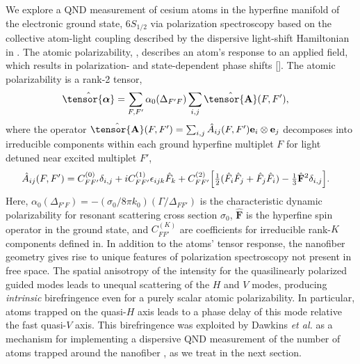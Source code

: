 \documentclass[preprint,aps,pra,onecolumn]{revtex4-1} %
\newcommand{\poltens}{\hat{\tensor{\boldsymbol{\alpha}}}}
\newcommand{\charpol}{\alpha_0(\Delta_{F'F})}
\begin{document}
 We explore a QND measurement of cesium atoms in the hyperfine manifold of the electronic ground state, $6S_{1/2}$ via polarization spectroscopy based on  the collective atom-light coupling described by the dispersive light-shift Hamiltonian in . The atomic polarizability, , describes an atom's response to an applied field, which results in polarization- and state-dependent phase shifts [].  The atomic polarizability is a rank-2 tensor,
	\begin{align} \label{Eq::Polarizability}
		\poltens %
		&=  \sum_{F,F'} \charpol \sum_{i,j} \hat{\tensor{\mbf{A}}}(F,F'),
	\end{align}
where the operator $\hat{\tensor{\mbf{A}}}(F,F') = \sum_{i,j} \hat{A}_{ij}(F,F')\mathbf{e}_i \otimes \mathbf{e}_j$ decomposes into irreducible components within each ground hyperfine multiplet $F$ for light detuned near excited multiplet $F'$,  
	\begin{align} \label{Eq::PolarizabilityIrrep}
		\hat{A}_{ij}(F,F')&=  C_{FF'}^{(0)} \delta_{i,j}+ iC_{FF'}^{(1)}\epsilon_{ijk}\hat{F}_k+ C_{FF'}^{(2)} \Big[ \mbox{$\frac{1}{2}$} ( \hat{F}_i\hat{F}_j +\hat{F}_j\hat{F}_i )-\mbox{$\frac{1}{3}$}\hat{\mathbf{F}}^2 \delta_{i,j} \Big]. 
\end{align}
Here, $\charpol = -(\sigma_0/8\pi k_0) (\Gamma/\Delta_{FF'})$ is the characteristic dynamic polarizability for resonant scattering cross section $\sigma_0$, $\hat{\mathbf{F}}$ is the hyperfine spin operator in the ground state, and $C_{FF'}^{(K)}$ are coefficients for irreducible rank-$K$ components defined in\cite{deutsch_quantum_2010}. In addition to the atoms' tensor response, the nanofiber geometry gives rise to unique features of polarization spectroscopy not present in free space.  The spatial anisotropy of the intensity for the quasilinearly polarized guided modes leads to unequal scattering of the $H$ and $V$ modes, producing \emph{intrinsic} birefringence even for a purely scalar atomic polarizability.  In particular, atoms trapped on the quasi-$H$ axis leads to a phase delay of this mode relative the fast quasi-$V$ axis. This birefringence was exploited by Dawkins {\em et al.} as a mechanism for implementing a dispersive QND measurement of the number of atoms trapped around the nanofiber \cite{dawkins_dispersive_2011}, as we treat in the next section. 
\end{document}
